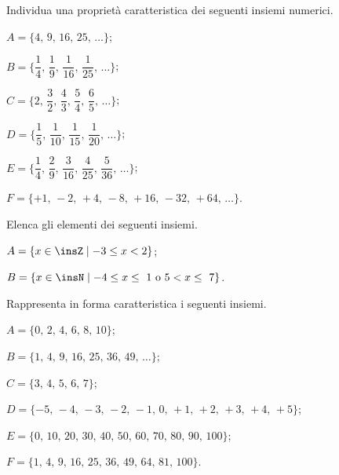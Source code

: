 \begin{esercizio}
Individua una proprietà caratteristica dei seguenti insiemi numerici.
\label{ese:6.18}
\begin{enumeratea}
\spazielenx
 \item $A=\{\text{4, 9, 16, 25, \ldots}\}$;
 \item $B=\bigg\{\dfrac{1}{4}\text{, }\dfrac{1}{9}\text{, }\dfrac{1}{16}\text{, }\dfrac{1}{25}\text{, }\ldots\bigg\}$;
 \item $C=\bigg\{2\text{, }\dfrac{3}{2}\text{, }\dfrac{4}{3}\text{, }\dfrac{5}{4}\text{, }\dfrac{6}{5}\text{, }\ldots\bigg\}$;
 \item $D=\bigg\{\dfrac{1}{5}\text{, }\dfrac{1}{10}\text{, }\dfrac{1}{15}\text{, }\dfrac{1}{20}\text{, }\ldots\bigg\}$;
 \item $E=\bigg\{\dfrac{1}{4}\text{, }\dfrac{2}{9}\text{, }\dfrac{3}{16}\text{, }\dfrac{4}{25}\text{, }\dfrac{5}{36}\text{, }\ldots\bigg\}$;
 \item $F=\{+1\text{, }-2\text{, }+4\text{, }-8\text{, }+16\text{, }-32\text{, }+64\text{, }\ldots\}$.
 \end{enumeratea}
\end{esercizio}

\begin{esercizio}
\label{ese:6.19}
Elenca gli elementi dei seguenti insiemi.
\begin{enumeratea}
\item $A=\{x\in\insZ\mid -3\le x<2\}$;
\item $B=\{x\in\insN\mid -4\le x\le~1\text{ o }5<x\le~7\}$.
\end{enumeratea}
\end{esercizio}

\begin{esercizio}
\label{ese:6.20}
Rappresenta in forma caratteristica i seguenti insiemi.
\begin{enumeratea}
\item $A=\{\text{0, 2, 4, 6, 8, 10}\}$;
\item $B=\{\text{1, 4, 9, 16, 25, 36, 49, \ldots}\}$;
\item $C=\{\text{3, 4, 5, 6, 7}\}$;
\item $D=\{-5\text{, }-4\text{, }-3\text{, }-2\text{, }-1\text{, }0\text{, }+1\text{, }+2\text{, }+3\text{, }+4\text{, }+5\}$;
\item $E=\{\text{0, 10, 20, 30, 40, 50, 60, 70, 80, 90, 100}\}$;
\item $F=\{\text{1, 4, 9, 16, 25, 36, 49, 64, 81, 100}\}$.
\end{enumeratea}
\end{esercizio}

